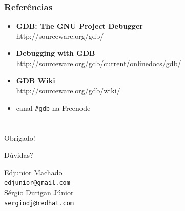 \documentclass[xcolor=pdftex,dvipsnames,table,t]{beamer}
\begin{document}
\begin{frame}
       \frametitle{Referências}
        \begin{center}
        \begin{itemize}
		\item \textbf{GDB: The GNU Project Debugger} \\
		http://sourceware.org/gdb/
		\item \textbf{Debugging with GDB} \\
		http://sourceware.org/gdb/current/onlinedocs/gdb/
		\item \textbf{GDB Wiki} \\
		http://sourceware.org/gdb/wiki/
		\item canal \texttt{\#gdb} na Freenode
	\end{itemize}
        \end{center}
\end{frame}

\section{}
\begin{frame}
	\begin{center}
	\LARGE
	\alert{Obrigado!}

	Dúvidas?


	\vspace{2\baselineskip}

	\small
	Edjunior Machado \\
	{\tt edjunior@gmail.com} \\
	\vspace{1\baselineskip}
	Sérgio Durigan Júnior \\
	{\tt sergiodj@redhat.com}
	\end{center}
\end{frame}
\end{document}
